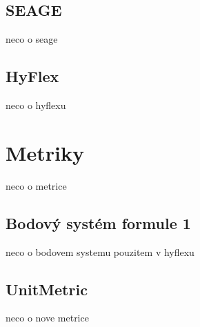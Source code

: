 \subsection{SEAGE}
neco o seage

\subsection{HyFlex}
neco o hyflexu



\section{Metriky}
neco o metrice

\subsection{Bodový systém formule 1}
neco o bodovem systemu pouzitem v hyflexu

\subsection{UnitMetric}
neco o nove metrice












